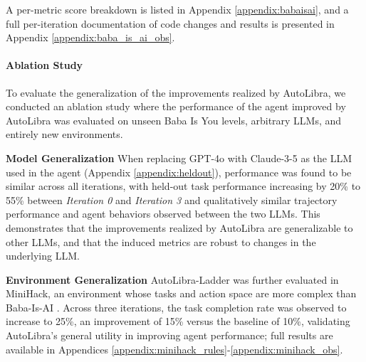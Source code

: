 A per-metric score breakdown is listed in Appendix \ref{appendix:babaisai}, and a full per-iteration documentation of code changes and results is presented in Appendix \ref{appendix:baba_is_ai_obs}.


\paragraph{Ablation Study}

To evaluate the generalization of the improvements realized by AutoLibra, we conducted an ablation study where the performance of the agent improved by AutoLibra was evaluated on unseen Baba Is You levels, arbitrary LLMs, and entirely new environments.

\textbf{Model Generalization} When replacing GPT-4o with Claude-3-5 as the LLM used in the agent (Appendix \ref{appendix:heldout}), performance was found to be similar across all iterations, with held-out task performance increasing by 20\% to 55\% between \textit{Iteration 0} and \textit{Iteration 3} and qualitatively similar trajectory performance and agent behaviors observed between the two LLMs. This demonstrates that the improvements realized by AutoLibra are generalizable to other LLMs, and that the induced metrics are robust to changes in the underlying LLM. %

\textbf{Environment Generalization} AutoLibra-Ladder was further evaluated in MiniHack, an environment whose tasks and action space are more complex than Baba-Is-AI \citep{samvelyan2021minihackplanetsandboxopenended}. Across three iterations, the task completion rate was observed to increase to 25\%, an improvement of 15\% versus the baseline of 10\%,  validating AutoLibra's general utility in improving agent performance; full results are available in Appendices \ref{appendix:minihack_rules}-\ref{appendix:minihack_obs}.



